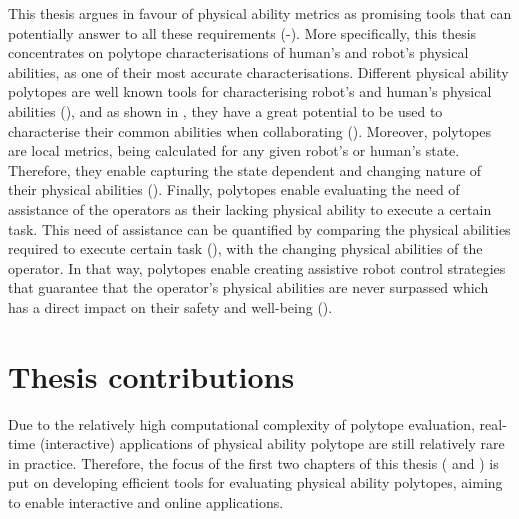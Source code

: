 
This thesis argues in favour of physical ability metrics as promising tools that can potentially answer to all these requirements (-). More specifically, this thesis concentrates on polytope characterisations of human's and robot's physical abilities, as one of their most accurate characterisations. Different physical ability polytopes are well known tools for characterising robot's and human's physical abilities (), and as shown in , they have a great potential to be used to characterise their common abilities when collaborating (). Moreover, polytopes are local metrics, being calculated for any given robot's or human's state. Therefore, they enable capturing the state dependent and changing nature of their physical abilities (). Finally, polytopes enable evaluating the need of assistance of the operators as their lacking physical ability to execute a certain task. This need of assistance can be quantified by comparing the physical abilities required to execute certain task (), with the changing physical abilities of the operator. In that way, polytopes enable creating assistive robot control strategies that guarantee that the operator's physical abilities are never surpassed which has a direct impact on their safety and well-being ().

\section{Thesis contributions}

Due to the relatively high computational complexity of polytope evaluation, real-time (interactive) applications of physical ability polytope  are still relatively rare in practice. Therefore, the focus of the first two chapters of this thesis  ( and ) is put on developing efficient tools for evaluating physical ability polytopes, aiming to enable interactive and online applications.


